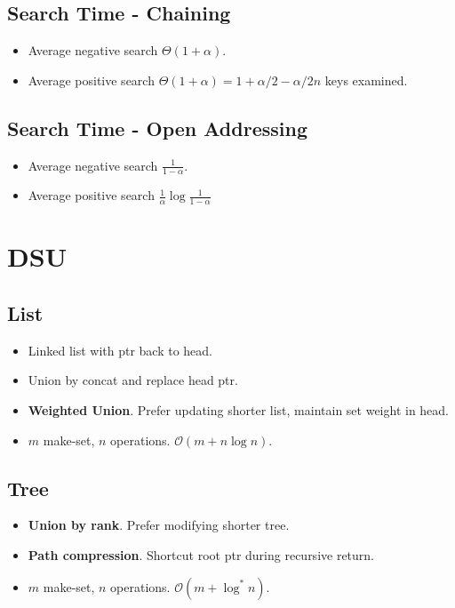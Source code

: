 \documentclass[11pt]{article}
\begin{document}
\begin{multicols}{4}
\subsection{Search Time - Chaining}

\begin{itemize}
	\item Average negative search $\Theta(1+\alpha)$.
	\item Average positive search $\Theta(1+\alpha) = 1 + \alpha/2 -
		\alpha/2n$ keys examined.
\end{itemize}

\subsection{Search Time - Open Addressing}

\begin{itemize}
	\item Average negative search $\frac{1}{1-\alpha}$.
	\item Average positive search $\frac{1}{\alpha} \log{\frac{1}{1-\alpha}}$
\end{itemize}

\section{DSU}

\subsection{List}

\begin{itemize}
	\item Linked list with ptr back to head.
	\item Union by concat and replace head ptr.
	\item \textbf{Weighted Union}. Prefer updating shorter list, maintain
		set weight in head.
	\item $m$ make-set, $n$ operations. $\mathcal{O}(m + n\log{n})$.

\end{itemize}

\subsection{Tree}

\begin{itemize}
	\item \textbf{Union by rank}. Prefer modifying shorter tree.
	\item \textbf{Path compression}. Shortcut root ptr during recursive
		return.
	\item $m$ make-set, $n$ operations. $\mathcal{O}(m + \log^{*}{n})$.
\end{itemize}

\end{multicols}
\end{document}
